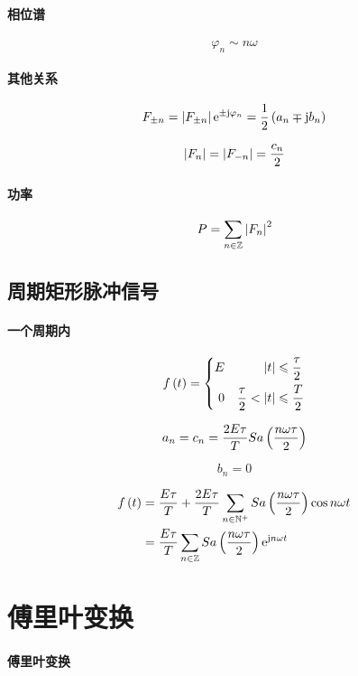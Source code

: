 \documentclass{article}
\begin{document}
\paragraph{相位谱}

\[\varphi_n\sim n\omega\]

\paragraph{其他关系}

\[F_{\pm n}=\left|F_{\pm n}\right|\mathrm e^{\pm\mathrm j\varphi_n}=\frac12\left(a_n\mp\mathrm j b_n\right)\]

\[\left|F_n\right|=\left|F_{-n}\right|=\frac{c_n}2\]

\paragraph{功率}

\[P=\sum_{n\in\mathbb Z}\left|F_n\right|^2\]

\subsection{周期矩形脉冲信号}

\paragraph{一个周期内}

\[f\left(t\right)=
    \left\{\begin{aligned}
        E &  & \left|t\right|            & \leqslant\frac\tau2 \\
        0 &  & \frac\tau2<\left|t\right| & \leqslant\frac T2
    \end{aligned}\right.\]

\[a_n=c_n=\frac{2E\tau}TSa\left(\frac{n\omega\tau}2\right)\]

\[b_n=0\]

\[\begin{aligned}
        f\left(t\right) & =\frac{E\tau}T+\frac{2E\tau}T\sum_{n\in\mathbb N^+}Sa\left(\frac{n\omega\tau}2\right)\cos n\omega t \\
            & =\frac{E\tau}T\sum_{n\in\mathbb Z}Sa\left(\frac{n\omega\tau}2\right)\mathrm e^{\mathrm j n\omega t}
    \end{aligned}\]

\section{傅里叶变换}

\paragraph{傅里叶变换}
\end{document}
